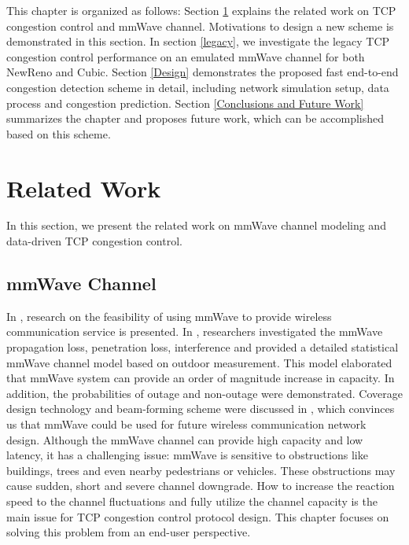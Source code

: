 \par This chapter is organized as follows: Section \ref{Related Work and Motivations} explains the related work on TCP congestion control and mmWave channel. Motivations to design a new scheme is demonstrated in this section. In section \ref{legacy}, we investigate the legacy TCP congestion control performance on an emulated mmWave channel for both NewReno and Cubic. Section \ref{Design} demonstrates the proposed fast end-to-end congestion detection scheme in detail, including network simulation setup, data process and congestion prediction. Section \ref{Conclusions and Future Work} summarizes the chapter and proposes future work, which can be accomplished based on this scheme.

\section{Related Work}
\label{Related Work and Motivations}
In this section, we present the related work on mmWave channel modeling and data-driven TCP congestion control.  
\subsection{mmWave Channel}
\par In \cite{niu2015survey}\cite{rappaport2013millimeter}, research on the feasibility of using mmWave to provide wireless communication service is presented. In \cite{akdeniz2014millimeter}, researchers investigated the mmWave propagation loss, penetration loss, interference and provided a detailed statistical mmWave channel model based on outdoor measurement. This model elaborated that mmWave system can provide an order of magnitude increase in capacity. In addition, the probabilities of outage and non-outage were demonstrated. Coverage design technology and beam-forming scheme were discussed in\cite{sun2014millimeter} \cite{roh2014millimeter}, which convinces us that mmWave could be used for future wireless communication network design. Although the mmWave channel can provide high capacity and low latency, it has a challenging issue: mmWave is sensitive to obstructions like buildings, trees and even nearby pedestrians or vehicles. These obstructions may cause sudden, short and severe channel downgrade. How to increase the reaction speed to the channel fluctuations and fully utilize the channel capacity is the main issue for TCP congestion control protocol design. This chapter focuses on solving this problem from an end-user perspective.

